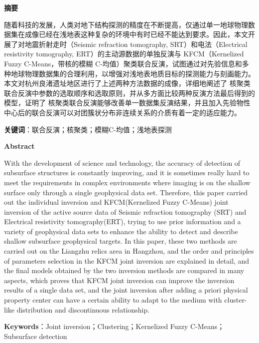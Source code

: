 \cleardoublepage{}
\begin{center}
    \bfseries {} 摘要
\end{center}

随着科技的发展，人类对地下结构探测的精度在不断提高，仅通过单一地球物理数据集在成像已经在浅地表这种复杂的环境中有时已经不能达到要求。因此，本文开展了对地震折射走时（Seismic refraction tomography, SRT）和电法（Electrical resistivity tomography, ERT）的主动源数据的单独反演与 KFCM（Kernelized Fuzzy C-Means，带核的模糊 C-均值）聚类联合反演，试图通过对先验信息和多种地球物理数据集的合理利用，以增强对浅地表地质目标的探测能力与刻画能力。本文对杭州良渚遗址地区进行了上述两种方法数据的成像，详细地阐述了 核聚类联合反演中参数的选取顺序和选取原则，并从多方面比较两种反演方法最后得到的模型，证明了 核聚类联合反演能够改善单一数据集反演结果，并且加入先验物性中心后的联合反演可以对团簇状分布非连续关系的介质有着一定的适应能力。

\textbf{关键词}：联合反演；核聚类；模糊C-均值；浅地表探测

\cleardoublepage{}
\begin{center}
    \bfseries {} Abstract
\end{center}

With the development of science and technology, the accuracy of detection of subsurface structures is constantly improving, and it is sometimes really hard to meet the requirements in complex environments where imaging is on the shallow surface only through a single geophysical data set. Therefore, this paper carried out the individual inversion and KFCM(Kernelized Fuzzy C-Means) joint inversion of the active source data of Seismic refraction tomography (SRT) and Electrical resistivity tomography(ERT), trying to use prior information and a variety of geophysical data sets to enhance the ability to detect and describe shallow subsurface geophysical targets. In this paper, these two methods are carried out on the Liangzhu relics area in Hangzhou, and the order and principles of parameters selection in the KFCM joint inversion are explained in detail, and the final models obtained by the two inversion methods are compared in many aspects, which proves that KFCM joint inversion can improve the inversion results of a single data set, and the joint inversion after adding a priori physical property center can have a certain ability to adapt to the medium with cluster-like distribution and discontinuous relationship.

\textbf{Keywords}：Joint inversion；Clustering；Kernelized Fuzzy C-Means；Subsurface detection